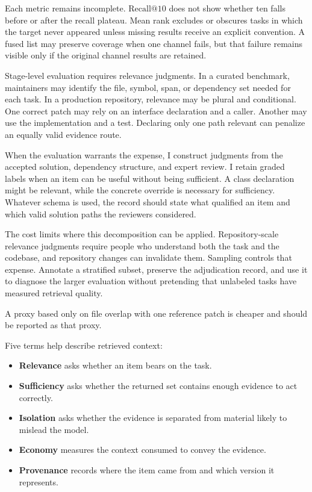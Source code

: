 Each metric remains incomplete. \(\mathrm{Recall}@10\) does not show whether ten falls before or after the recall plateau. Mean rank excludes or obscures tasks in which the target never appeared unless missing results receive an explicit convention. A fused list may preserve coverage when one channel fails, but that failure remains visible only if the original channel results are retained.

Stage-level evaluation requires relevance judgments. In a curated benchmark, maintainers may identify the file, symbol, span, or dependency set needed for each task. In a production repository, relevance may be plural and conditional. One correct patch may rely on an interface declaration and a caller. Another may use the implementation and a test. Declaring only one path relevant can penalize an equally valid evidence route.

When the evaluation warrants the expense, I construct judgments from the accepted solution, dependency structure, and expert review. I retain graded labels when an item can be useful without being sufficient. A class declaration might be relevant, while the concrete override is necessary for sufficiency. Whatever schema is used, the record should state what qualified an item and which valid solution paths the reviewers considered.

The cost limits where this decomposition can be applied. Repository-scale relevance judgments require people who understand both the task and the codebase, and repository changes can invalidate them. Sampling controls that expense. Annotate a stratified subset, preserve the adjudication record, and use it to diagnose the larger evaluation without pretending that unlabeled tasks have measured retrieval quality.

A proxy based only on file overlap with one reference patch is cheaper and should be reported as that proxy.


Five terms help describe retrieved context:

\begin{itemize}
\tightlist
\item
  \textbf{Relevance} asks whether an item bears on the task.
\item
  \textbf{Sufficiency} asks whether the returned set contains enough evidence to act correctly.
\item
  \textbf{Isolation} asks whether the evidence is separated from material likely to mislead the model.
\item
  \textbf{Economy} measures the context consumed to convey the evidence.
\item
  \textbf{Provenance} records where the item came from and which version it represents.
\end{itemize}

